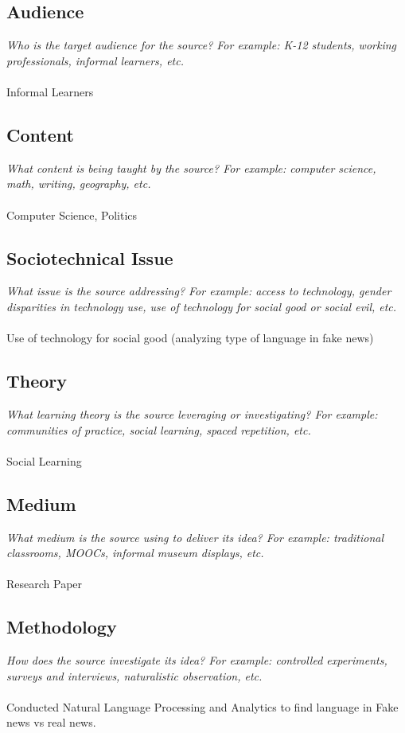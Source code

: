 \documentclass[12pt, final]{article}
\begin{document}
\subsection{Audience}
\textit{Who is the target audience for the source? For example: K-12 students, working professionals, informal learners, etc.}
\\
\\
Informal Learners

\subsection{Content}
\textit{What content is being taught by the source? For example: computer science, math, writing, geography, etc.}
\\
\\
Computer Science, Politics

\subsection{Sociotechnical Issue}
\textit{What issue is the source addressing? For example: access to technology, gender disparities in technology use, use of technology for social good or social evil, etc.}
\\
\\
Use of technology for social good (analyzing type of language in fake news)

\subsection{Theory}
\textit{What learning theory is the source leveraging or investigating? For example: communities of practice, social learning, spaced repetition, etc.}
\\
\\
Social Learning

\subsection{Medium}
\textit{What medium is the source using to deliver its idea? For example: traditional classrooms, MOOCs, informal museum displays, etc.}
\\
\\
Research Paper

\subsection{Methodology}
\textit{How does the source investigate its idea? For example: controlled experiments, surveys and interviews, naturalistic observation, etc.}
\\
\\
Conducted Natural Language Processing and Analytics to find language in Fake news vs real news.
\end{document}
